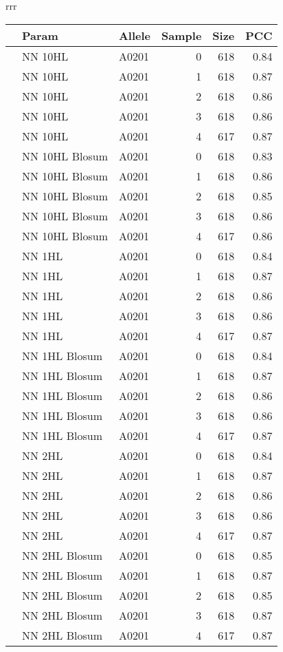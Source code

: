 \begin{table*}[hb]\scriptsize
\begin{center}
\begin{tabular}{rrr}

\begin{tabular}{rllrrr}
  \hline
 & Param & Allele & Sample & Size & PCC \\ 
  \hline
   & NN 10HL & A0201 &   0 & 618 & 0.84 \\ 
   & NN 10HL & A0201 &   1 & 618 & 0.87 \\ 
   & NN 10HL & A0201 &   2 & 618 & 0.86 \\ 
   & NN 10HL & A0201 &   3 & 618 & 0.86 \\ 
   & NN 10HL & A0201 &   4 & 617 & 0.87 \\ 
   \hline
   & NN 10HL Blosum & A0201 &   0 & 618 & 0.83 \\ 
   & NN 10HL Blosum & A0201 &   1 & 618 & 0.86 \\ 
   & NN 10HL Blosum & A0201 &   2 & 618 & 0.85 \\ 
   & NN 10HL Blosum & A0201 &   3 & 618 & 0.86 \\ 
   & NN 10HL Blosum & A0201 &   4 & 617 & 0.86 \\ 
   \hline
   & NN 1HL & A0201 &   0 & 618 & 0.84 \\ 
   & NN 1HL & A0201 &   1 & 618 & 0.87 \\ 
   & NN 1HL & A0201 &   2 & 618 & 0.86 \\ 
   & NN 1HL & A0201 &   3 & 618 & 0.86 \\ 
   & NN 1HL & A0201 &   4 & 617 & 0.87 \\ 
   \hline
   & NN 1HL Blosum & A0201 &   0 & 618 & 0.84 \\ 
   & NN 1HL Blosum & A0201 &   1 & 618 & 0.87 \\ 
   & NN 1HL Blosum & A0201 &   2 & 618 & 0.86 \\ 
   & NN 1HL Blosum & A0201 &   3 & 618 & 0.86 \\ 
   & NN 1HL Blosum & A0201 &   4 & 617 & 0.87 \\ 
   \hline
   & NN 2HL & A0201 &   0 & 618 & 0.84 \\ 
   & NN 2HL & A0201 &   1 & 618 & 0.87 \\ 
   & NN 2HL & A0201 &   2 & 618 & 0.86 \\ 
   & NN 2HL & A0201 &   3 & 618 & 0.86 \\ 
   & NN 2HL & A0201 &   4 & 617 & 0.87 \\ 
   \hline
   & NN 2HL Blosum & A0201 &   0 & 618 & 0.85 \\ 
   & NN 2HL Blosum & A0201 &   1 & 618 & 0.87 \\ 
   & NN 2HL Blosum & A0201 &   2 & 618 & 0.85 \\ 
   & NN 2HL Blosum & A0201 &   3 & 618 & 0.87 \\ 
   & NN 2HL Blosum & A0201 &   4 & 617 & 0.87 \\ 
   \hline
\end{tabular}



\end{tabular}
\end{center}
\end{table*}
